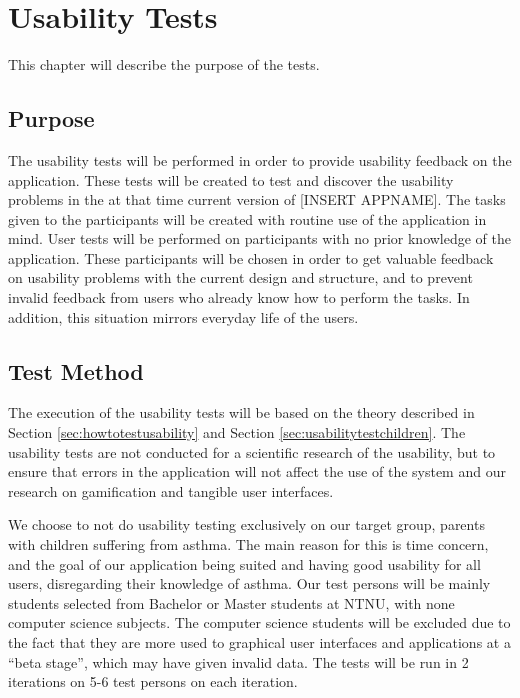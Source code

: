\chapter{Usability Tests}
\label{chp:usabilitytests}

This chapter will describe the purpose of the tests.


\section{Purpose}
\label{sec:usabilitypurpose}
The usability tests will be performed in order to provide usability feedback on the application. These tests will be created to test and discover the usability problems in the at that time current version of [INSERT APPNAME]. The tasks given to the participants will be created with routine use of the application in mind. User tests will be performed on participants with no prior knowledge of the application. These participants will be chosen in order to get valuable feedback on usability problems with the current design and structure, and to prevent invalid feedback from users who already know how to perform the tasks. In addition, this situation mirrors everyday life of the users.


\section{Test Method}
The execution of the usability tests will be based on the theory described in Section \ref{sec:howtotestusability} and Section \ref{sec:usabilitytestchildren}. The usability tests are not conducted for a scientific research of the usability, but to ensure that errors in the application will not affect the use of the system and our research on gamification and tangible user interfaces.

We choose to not do usability testing exclusively on our target group, parents with children suffering from asthma. The main reason for this is time concern, and the goal of our application being suited and having good usability for all users, disregarding their knowledge of asthma. Our test persons will be mainly students selected from Bachelor or Master students at NTNU, with none computer science subjects. The computer science students will be excluded due to the fact that they are more used to graphical user interfaces and applications at a ``beta stage'', which may have given invalid data. The tests will be run in 2 iterations on 5-6 test persons on each iteration. 

